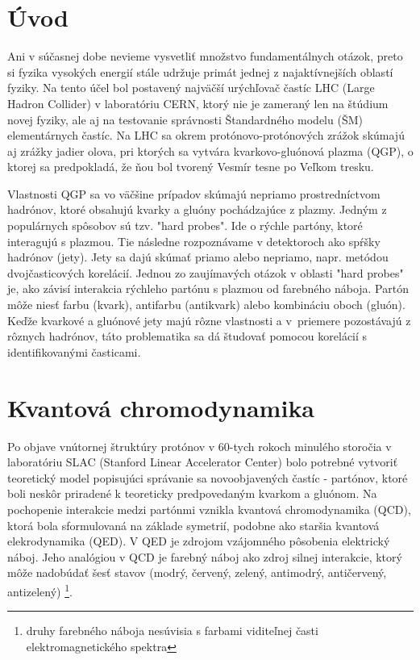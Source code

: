 \documentclass[thesismargins, thesislinespacing]{rnthesis}
\begin{document}
\newpage


\chapter*{Úvod}
Ani v súčasnej dobe nevieme vysvetliť množstvo fundamentálnych otázok, preto si fyzika vysokých energií stále udržuje primát jednej z najaktívnejších oblastí fyziky. Na tento účel bol postavený najväčší urýchľovač častíc LHC (Large Hadron Collider) v laboratóriu CERN, ktorý nie je zameraný len na štúdium novej fyziky, ale aj na testovanie správnosti Štandardného modelu (ŠM) elementárnych častíc. Na LHC sa okrem protónovo-protónových zrážok skúmajú aj zrážky jadier olova, pri ktorých  sa vytvára kvarkovo-gluónová plazma (QGP), o ktorej sa predpokladá, že ňou bol tvorený Vesmír tesne po Veľkom tresku. 

Vlastnosti QGP sa vo väčšine prípadov skúmajú nepriamo prostredníctvom \-had\-ró\-nov, ktoré obsahujú kvarky a gluóny pochádzajúce z plazmy. Jedným z populárnych \-spô\-so\-bov sú tzv. "hard probes". Ide o rýchle partóny, ktoré interagujú s plazmou. Tie následne rozpoznávame v detektoroch ako spŕšky hadrónov (jety). Jety sa dajú skúmať \-pria\-mo alebo nepriamo, napr. metódou dvojčasticových korelácií. Jednou zo zaujímavých otázok v oblasti "hard probes" \-je, ako závisí interakcia rýchleho partónu s plazmou od farebného náboja. Partón môže niesť farbu (kvark), antifarbu (antikvark) alebo kombináciu oboch (gluón). Keďže kvarkové a gluónové jety majú rôzne vlastnosti a v~priemere pozostávajú z rôznych hadrónov, táto problematika sa dá študovať pomocou korelácií s identifikovanými časticami.  

\chapter{Kvantová chromodynamika}

Po objave vnútornej štruktúry protónov v 60-tych rokoch minulého storočia v laboratóriu SLAC (Stanford Linear Accelerator Center) bolo potrebné vytvoriť teoretický model popisujúci správanie sa novoobjavených častíc - partónov, ktoré boli neskôr priradené k teoreticky predpovedaným kvarkom a gluónom. Na pochopenie interakcie medzi partónmi vznikla kvantová chromodynamika (QCD), ktorá bola sformulovaná na základe symetrií, podobne ako staršia kvantová elekrodynamika (QED). V QED je zdrojom vzájomného pôsobenia elektrický náboj. Jeho analógiou v QCD je farebný náboj ako zdroj silnej interakcie, ktorý môže nadobúdať šesť stavov (modrý, červený, zelený, antimodrý, antičervený, antizelený) \footnote{druhy farebného náboja nesúvisia s farbami viditeľnej časti elektromagnetického spektra}.
\end{document}
